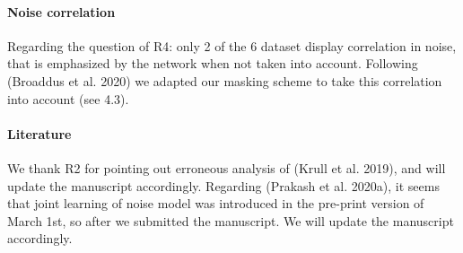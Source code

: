 \documentclass{article}
\begin{document}
\paragraph{Noise correlation}
Regarding the question of R4: only 2 of the 6 dataset display correlation in noise, that is emphasized by the network when not taken into account.
Following (Broaddus et al. 2020) we adapted our masking scheme to take this correlation into account (see 4.3).

\paragraph{Literature}
We thank R2 for pointing out erroneous analysis of (Krull et al. 2019), and will update the manuscript accordingly.
Regarding (Prakash et al. 2020a), it seems that joint learning of noise model was introduced in the pre-print version of March 1st, so after we submitted the manuscript. We will update the manuscript accordingly.
\end{document}
